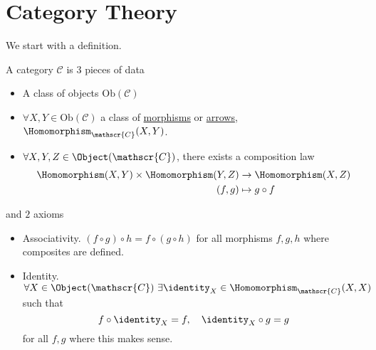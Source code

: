 \section{Category Theory}
We start with a definition.
\begin{definition}
	A category \(\mathscr{C} \) is \(3\) pieces of data
	\begin{itemize}
		\item A class of objects \(\mathrm{Ob}(\mathscr{C})\)
		\item \(\forall X, Y\in\mathrm{Ob} (\mathscr{C})\) a class of \underline{morphisms} or \underline{arrows},
		      \(\Homomorphism_{\mathscr{C}}(X, Y)\).
		\item \(\forall X, Y, Z\in \Object (\mathscr{C})\), there exists a composition law
		      \[
			      \begin{split}
				      \Homomorphism (X, Y)\times \Homomorphism (Y, Z)&\to \Homomorphism (X, Z)\\
				      (f, g)&\mapsto g\circ f
			      \end{split}
		      \]
	\end{itemize}
	and \(2\) axioms
	\begin{itemize}
		\item Associativity. \((f\circ g)\circ h = f\circ (g\circ h)\) for all morphisms \(f, g, h\) where composites are defined.
		\item Identity. \(\forall X\in\Object (\mathscr{C})\ \exists \identity_{X}\in\Homomorphism _{\mathscr{C}} (X, X)\) such that
		      \[
			      f\circ \identity_{X} = f,\quad \identity_{X} \circ g = g
		      \]
		      for all \(f, g\) where this makes sense.
	\end{itemize}
\end{definition}


